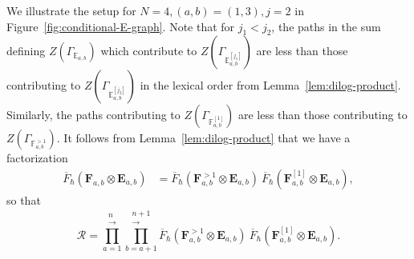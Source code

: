 \documentclass[11pt, reqno]{amsart}
\theoremstyle{definition}
\numberwithin{equation}{section}
\def\beq{\begin{equation}}
\def\eeq{\end{equation}}
\def\Rc{\mathcal R}
\def\stgE{\mathbf{E}}
\def\stgF{\mathbf{F}}
\begin{document}
We illustrate the setup for $N=4, (a,b)=(1,3), j=2$ in Figure~\ref{fig:conditional-E-graph}. Note that for $j_1<j_2$, the paths in the sum defining $Z(\Gamma_{{\mathbb{E}_{a,b}}})$ which contribute to $Z(\Gamma_{{\mathbb{E}^{[j_1]}_{a,b}}})$ are less than those contributing to $Z(\Gamma_{{\mathbb{E}^{[j_2]}_{a,b}}})$ in the lexical order from Lemma~\ref{lem:dilog-product}. Similarly, the paths contributing to $Z(\Gamma_{{\mathbb{F}^{[1]}_{a,b}}})$ are less than those contributing to $Z(\Gamma_{{\mathbb{F}^{>1}_{a,b}}})$. It follows from Lemma~\ref{lem:dilog-product} that we have a factorization
\begin{align*}
\overline{F}_\hbar(\stgF_{a,b}\otimes \stgE_{a,b}) &= \overline{F}_\hbar( \stgF^{>1}_{a,b}\otimes\stgE_{a,b})~\overline{F}_\hbar( \stgF^{[1]}_{a,b}\otimes\stgE_{a,b}),
\end{align*}
so that
\beq
\label{eq:R-init3}
\Rc = \prod_{a=1}^{\substack{n \\[-2pt] \longrightarrow}} \prod_{b=a+1}^{\substack{n+1 \\[-2pt] \longrightarrow}} \overline{F}_\hbar( \stgF^{>1}_{a,b}\otimes \stgE_{a,b})~\overline{F}_\hbar( \stgF^{[1]}_{a,b}\otimes \stgE_{a,b}).
\eeq
\end{document}
